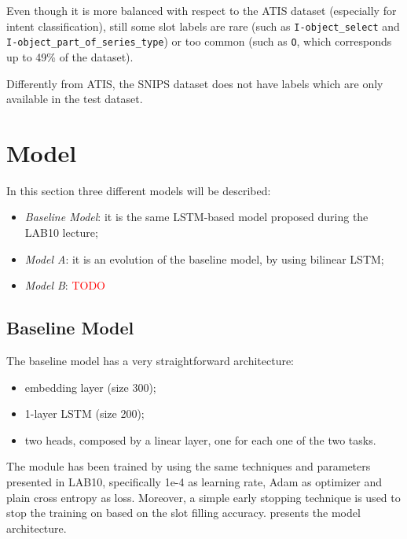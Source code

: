 \documentclass[a4paper]{article}
\begin{document}
Even though it is more balanced with respect to the ATIS dataset (especially for intent classification), still some slot labels are rare (such as \texttt{I-object\_select} and \texttt{I-object\_part\_of\_series\_type}) or too common (such as \texttt{O}, which corresponds up to 49\% of the dataset).

Differently from ATIS, the SNIPS dataset does not have labels which are only available in the test dataset.

\section{Model}
In this section three different models will be described:
\begin{itemize}
    \item \textit{Baseline Model}: it is the same LSTM-based model proposed during the LAB10 lecture;
    \item \textit{Model A}: it is an evolution of the baseline model, by using bilinear LSTM;
    \item \textit{Model B}: \textcolor{red}{TODO}
\end{itemize}

\subsection{Baseline Model}
The baseline model has a very straightforward architecture:
\begin{itemize}
    \item embedding layer (size 300);
    \item 1-layer LSTM (size 200);
    \item two heads, composed by a linear layer, one for each one of the two tasks.
\end{itemize}
The module has been trained by using the same techniques and parameters presented in LAB10, specifically 1e-4 as learning rate, Adam as optimizer and plain cross entropy as loss. Moreover, a simple early stopping technique is used to stop the training on based on the slot filling accuracy.  presents the model architecture.
\end{document}
